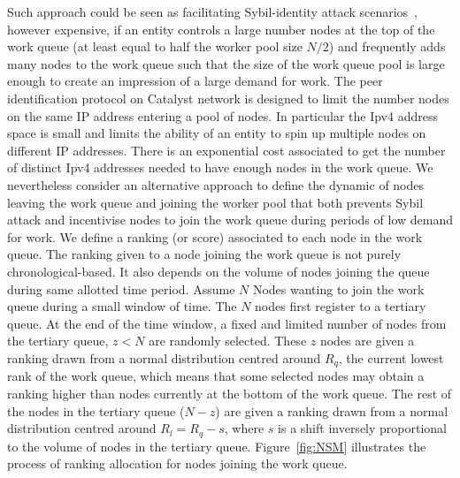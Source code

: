 Such approach could be seen as facilitating Sybil-identity attack scenarios~\cite{sybil}, however expensive, if an entity controls a large number nodes at the top of the work queue (at least equal to half the worker pool size $N/2$) and frequently adds many nodes to the work queue such that the size of the work queue pool is large enough to create an impression of a large demand for work. The peer identification protocol on Catalyst network is designed to limit the number nodes on the same IP address entering a pool of nodes. In particular the Ipv4 address space is small and limits the ability of an entity to spin up multiple nodes on different IP addresses. There is an exponential cost associated to get the number of distinct Ipv4 addresses needed to have enough nodes in the work queue.
We nevertheless consider an alternative approach to define the dynamic of nodes leaving the work queue and joining the worker pool that both prevents Sybil attack and incentivise nodes to join the work queue during periods of low demand for work. We define a ranking (or score) associated to each node in the work queue. The ranking given to a node joining the work queue is not purely chronological-based. It also depends on the volume of nodes joining the queue during same allotted time period. Assume $N$ Nodes wanting to join the work queue during a small window of time. The $N$ nodes first register to a tertiary queue. At the end of the time window, a fixed and limited number of nodes from the tertiary queue, $z < N$ are randomly selected. These $z$ nodes are given a ranking drawn from a normal distribution centred around $R_q$, the current lowest rank of the work queue, which means that some selected nodes may obtain a ranking higher than nodes currently at the bottom of the work queue. The rest of the nodes in the tertiary queue ($N-z$) are given a ranking drawn from a normal distribution centred around $R_l = R_q - s$, where $s$ is a shift inversely proportional to the volume of nodes in the tertiary queue. Figure~\ref{fig:NSM} illustrates the process of ranking allocation for nodes joining the work queue. 

